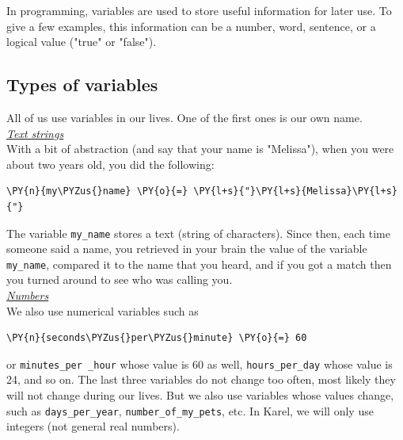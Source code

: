 \noindent
In programming, variables are used to store useful information for later use. 
To give a few examples, this information can be a number, word, sentence, 
or a logical value ("true" or "false").

\subsection[\ \ Types of variables]{Types of variables}

All of us use variables in our lives. One of 
the first ones is our own name. \\

\noindent
\underline{\em Text strings}\\

\noindent
With a bit of abstraction (and say that your name is "Melissa"), 
when you were about two years old, you did the following:\\

\begin{bbox}
\begin{Verbatim}[commandchars=\\\{\}]
\PY{n}{my\PYZus{}name} \PY{o}{=} \PY{l+s}{"}\PY{l+s}{Melissa}\PY{l+s}{"}
\end{Verbatim}
\end{bbox}
\vspace{6mm}

\noindent
The variable {\tt my\_name} stores a text (string of characters). 
Since then, each time someone said a name, you retrieved in your brain the value of the variable
{\tt my\_name}, compared it to the name that you heard, and if you got a match then you turned around 
to see who was calling you. \\

\noindent
\underline{\em Numbers}\\

\noindent
We also use numerical variables such as\\

\begin{bbox}
\begin{Verbatim}[commandchars=\\\{\}]
\PY{n}{seconds\PYZus{}per\PYZus{}minute} \PY{o}{=} 60
\end{Verbatim}
\end{bbox}
\vspace{6mm}

\noindent
or {\tt minutes\_per \_hour} whose value is 60 as well, 
{\tt hours\_per\_day} whose value is 24, and so on. The last three variables do not change 
too often, most likely they will not change during our lives. But we also use variables whose 
values change, such as {\tt days\_per\_year}, {\tt number\_of\_my\_pets}, etc. In Karel, we
will only use integers (not general real numbers).\\

